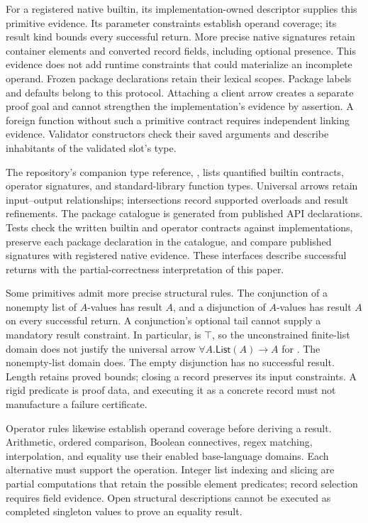 \documentclass[10pt,a4paper]{article}
\newcommand{\code}[1]{\texttt{\detokenize{#1}}}
\newcommand{\List}{\mathsf{List}}
\theoremstyle{remark}
\begin{document}
For a registered native builtin, its implementation-owned descriptor supplies
this primitive evidence. Its parameter constraints establish operand coverage;
its result kind bounds every successful return. More precise native signatures
retain container elements and converted record fields, including optional
presence. This evidence does not add runtime constraints that could materialize
an incomplete operand. Frozen package declarations retain their lexical scopes.
Package labels and defaults belong to this protocol. Attaching a client arrow
creates a separate proof goal
and cannot strengthen the implementation's evidence by assertion. A foreign
function without such a primitive contract requires independent linking
evidence. Validator constructors check their saved arguments and describe
inhabitants of the validated slot's type.

The repository's companion type reference,
\href{types.md}{\code{doc/types.md}}, lists quantified builtin contracts,
operator signatures, and standard-library function types. Universal arrows
retain input--output relationships; intersections record supported overloads
and result refinements. The package catalogue is generated from published API
declarations. Tests check the written builtin and operator contracts against
implementations, preserve each package declaration in the catalogue, and
compare published signatures with registered native evidence. These interfaces
describe successful returns with the partial-correctness interpretation of
this paper.

Some primitives admit more precise structural rules. The conjunction of a
nonempty list of $A$-values has result $A$, and a disjunction of $A$-values has
result $A$ on every successful return. A conjunction's optional tail cannot
supply a mandatory result constraint. In particular, \code{and([])} is
$\top$, so the unconstrained finite-list domain does not justify the universal
arrow $\forall A.\List(A)\to A$ for \code{and}. The nonempty-list domain
does. The empty disjunction has no successful result. Length retains proved
bounds; closing a record preserves its input constraints. A rigid predicate
is proof data, and executing it as a concrete record must not manufacture a
failure certificate.

Operator rules likewise establish operand coverage before deriving a result.
Arithmetic, ordered comparison, Boolean connectives, regex matching,
interpolation, and equality use their enabled base-language domains. Each
alternative must support the operation. Integer list indexing and slicing are
partial computations that retain the possible element predicates; record
selection requires field evidence. Open structural descriptions cannot be
executed as completed singleton values to prove an equality result.
\end{document}
